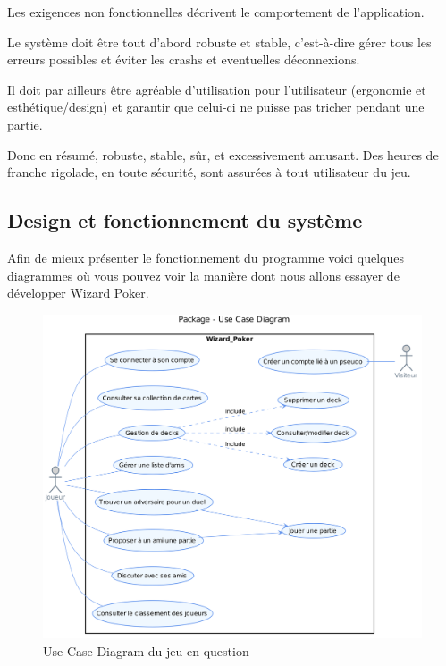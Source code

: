 \documentclass[11pt,a4paper]{article}
\begin{document}
Les exigences non fonctionnelles décrivent le comportement de
l'application.

Le système doit être tout d'abord robuste et stable, c'est-à-dire
gérer tous les erreurs possibles et éviter les crashs et eventuelles
déconnexions.

Il doit par ailleurs être agréable d'utilisation pour l'utilisateur
(ergonomie et esthétique/design) et garantir que celui-ci ne puisse
pas tricher pendant une partie.

Donc en résumé, robuste, stable, sûr, et excessivement amusant. Des
heures de franche rigolade, en toute sécurité, sont assurées à tout
utilisateur du jeu.

\subsection{Design et fonctionnement du système}
\label{sec:design}

Afin de mieux présenter le fonctionnement du programme voici quelques
diagrammes où vous pouvez voir la manière dont nous allons essayer de
développer Wizard Poker.


\begin{figure}
  \centering
  \includegraphics[width=1\textwidth]{../uml_files/UseCaseDiagram.png}
  \caption{\label{fig:usecase} Use Case Diagram du jeu en question}
\end{figure}
\end{document}
